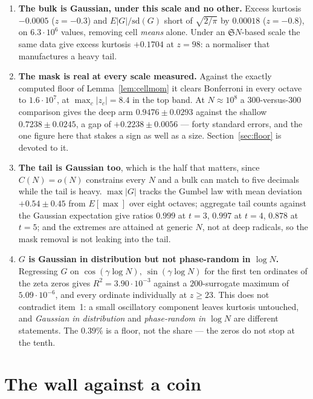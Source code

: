 \documentclass[11pt,a4paper]{article}
\theoremstyle{plain}
\theoremstyle{definition}
\renewcommand{\SS}{\mathfrak{S}}
\begin{document}
\begin{enumerate}
\item \textbf{The bulk is Gaussian, under this scale and no other.}
  Excess kurtosis $-0.0005$ ($z=-0.3$) and
  $E|G|/\mathrm{sd}(G)$ short of $\sqrt{2/\pi}$ by $0.00018$
  ($z=-0.8$), on $6.3\cdot10^6$ values, removing cell \emph{means}
  alone. Under an $\SS N$-based scale the same data give excess
  kurtosis $+0.1704$ at $z=98$: a normaliser that manufactures a heavy
  tail.

\item \textbf{The mask is real at every scale measured.} Against the
  exactly computed floor of Lemma~\ref{lem:cellmom} it clears
  Bonferroni in every octave to $1.6\cdot10^7$, at $\max_c|z_c| = 8.4$
  in the top band. At $N\approx10^8$ a $300$-versus-$300$ comparison
  gives the deep arm $0.9476\pm0.0293$ against the shallow
  $0.7238\pm0.0245$, a gap of $+0.2238\pm0.0056$ --- forty standard
  errors, and the one figure here that stakes a sign as well as a size.
  Section~\ref{sec:floor} is devoted to it.

\item \textbf{The tail is Gaussian too}, which is the half that
  matters, since $C(N)=o(N)$ constrains every $N$ and a bulk can match
  to five decimals while the tail is heavy. $\max|G|$ tracks the Gumbel
  law with mean deviation $+0.54\pm0.45$ from $E[\max]$ over eight
  octaves; aggregate tail counts against the Gaussian expectation give
  ratios $0.999$ at $t=3$, $0.997$ at $t=4$, $0.878$ at $t=5$; and the
  extremes are attained at generic $N$, not at deep radicals, so the
  mask removal is not leaking into the tail.

\item \textbf{$G$ is Gaussian in distribution but not phase-random in
  $\log N$.} Regressing $G$ on
  $\cos(\gamma\log N),\ \sin(\gamma\log N)$ for the first ten ordinates
  of the zeta zeros gives $R^2 = 3.90\cdot10^{-3}$ against a
  $200$-surrogate maximum of $5.09\cdot10^{-6}$, and every ordinate
  individually at $z\ge23$. This does not contradict item~1: a small
  oscillatory component leaves kurtosis untouched, and \emph{Gaussian
  in distribution} and \emph{phase-random in $\log N$} are different
  statements. The $0.39\%$ is a floor, not the share --- the zeros do
  not stop at the tenth.
\end{enumerate}

\section{The wall against a coin}\label{sec:coin}
\end{document}
